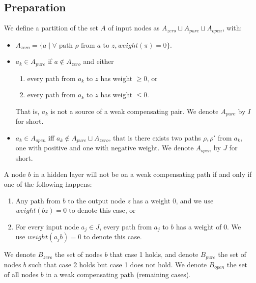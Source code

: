 			
			\subsection{Preparation}
			
			\begin{definition}
				We define a partition of the set $A$ of input nodes as $A_{zero} \sqcup A_{pure}\sqcup A_{open}$, with:  
				\begin{itemize}
					\item $A_{zero}= \{a \mid \forall \text{ path $\rho$ from $a$ to } z, weight(\pi)=0\}$.
	
					\item $a_k \in A_{pure}$  if $a \notin A_{zero}$ and either
					\begin{enumerate}
						\item every path from $a_k$ to $z$ has weight $\geq 0$, or
						\item every path from $a_k$ to $z$ has weight $\leq 0$. 
						
					\end{enumerate}
					That is, $a_k$ is not a source of a weak compensating pair. We denote 
					$A_{pure}$ by $I$ for short.
					\item $a_k \in A_{open}$ iff $a_k \notin A_{pure} \sqcup A_{zero}$, that is there exists two paths $\rho,\rho'$ from $a_k$, one with positive and one with negative weight. 	We denote $A_{open}$ by $J$ for short.
				\end{itemize}
			\end{definition} 
			
			
			
			\begin{lemma} \label{lem:open_node_2}
				A node $b$ in a hidden layer will not be on a weak compensating path if and only if one of the following happens:
				\begin{enumerate}
					\item Any path from $b$ to the output node $z$ has a weight $0$, and we use $weight({bz})=0$ to denote this case, or
					\item For every input node $a_j\in J$, every path from $a_j$ to $b$ has a weight of $0$. We use $weight({a_jb})=0$ to denote this case.
				\end{enumerate}
				
			\end{lemma}
			
			We denote $B_{zero}$ the set of nodes $b$ that case 1 holds, and denote $B_{pure}$ the set of nodes $b$ such that case 2 holds but case 1 does not hold.
			We denote $B_{open}$ the set of all nodes $b$ in a weak compensating path (remaining cases).
			
